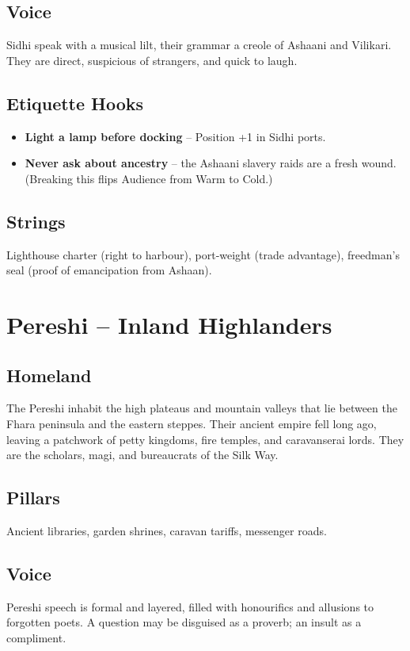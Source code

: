 \documentclass[11pt]{book}
\begin{document}
\subsection*{Voice}
Sidhi speak with a musical lilt, their grammar a creole of Ashaani and Vilikari. They are direct, suspicious of strangers, and quick to laugh.

\subsection*{Etiquette Hooks}
\begin{itemize}
    \item \textbf{Light a lamp before docking} -- Position +1 in Sidhi ports.
    \item \textbf{Never ask about ancestry} -- the Ashaani slavery raids are a fresh wound. (Breaking this flips Audience from Warm to Cold.)
\end{itemize}

\subsection*{Strings}
Lighthouse charter (right to harbour), port‑weight (trade advantage), freedman’s seal (proof of emancipation from Ashaan).

\section{Pereshi -- Inland Highlanders}
\subsection*{Homeland}
The Pereshi inhabit the high plateaus and mountain valleys that lie between the Fhara peninsula and the eastern steppes. Their ancient empire fell long ago, leaving a patchwork of petty kingdoms, fire temples, and caravanserai lords. They are the scholars, magi, and bureaucrats of the Silk Way.

\subsection*{Pillars}
Ancient libraries, garden shrines, caravan tariffs, messenger roads.

\subsection*{Voice}
Pereshi speech is formal and layered, filled with honourifics and allusions to forgotten poets. A question may be disguised as a proverb; an insult as a compliment.
\end{document}
